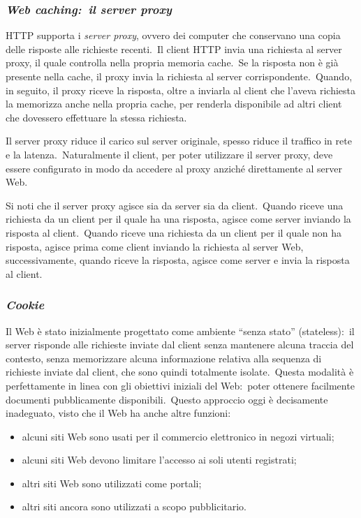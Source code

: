 \subsubsection{\emph{Web caching:\ il server proxy}}

HTTP supporta i \emph{server proxy}, ovvero dei computer che conservano una copia delle risposte alle richieste recenti.\
Il client HTTP invia una richiesta al server proxy, il quale controlla nella propria memoria cache.\
Se la risposta non è già presente nella cache, il proxy invia la richiesta al server corrispondente.\
Quando, in seguito, il proxy riceve la risposta, oltre a inviarla al client che l'aveva richiesta la memorizza anche nella propria cache, per renderla disponibile ad altri client che dovessero effettuare la stessa richiesta.

Il server proxy riduce il carico sul server originale, spesso riduce il traffico in rete e la latenza.\
Naturalmente il client, per poter utilizzare il server proxy, deve essere configurato in modo da accedere al proxy anziché direttamente al server Web.

Si noti che il server proxy agisce sia da server sia da client.\
Quando riceve una richiesta da un client per il quale ha una risposta, agisce come server inviando la risposta al client.\
Quando riceve una richiesta da un client per il quale non ha risposta, agisce prima come client inviando la richiesta al server Web, successivamente, quando riceve la risposta, agisce come server e invia la risposta al client.

\subsubsection{\emph{Cookie}}

Il Web è stato inizialmente progettato come ambiente ``senza stato'' (stateless):\ il server risponde alle richieste inviate dal client senza mantenere alcuna traccia del contesto, senza memorizzare alcuna informazione relativa alla sequenza di richieste inviate dal client, che sono quindi totalmente isolate.\
Questa modalità è perfettamente in linea con gli obiettivi iniziali del Web:\ poter ottenere facilmente documenti pubblicamente disponibili.\
Questo approccio oggi è decisamente inadeguato, visto che il Web ha anche altre funzioni:
\begin{itemize}
    \item alcuni siti Web sono usati per il commercio elettronico in negozi virtuali;
    \item alcuni siti Web devono limitare l'accesso ai soli utenti registrati;
    \item altri siti Web sono utilizzati come portali;
    \item altri siti ancora sono utilizzati a scopo pubblicitario.
\end{itemize}

